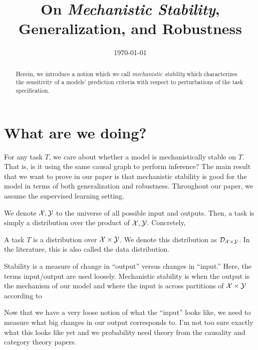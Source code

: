 \documentclass[10pt]{article}
\title{On \textit{Mechanistic Stability}, Generalization, and Robustness}
\date{\today}
\begin{document}
\ifthenelse{\isundefined{\showlinenum}}{
}{
\linenumbers
}
\maketitle

\begin{abstract}
Herein, we introduce a notion which we call \textit{mechanistic stability} which
characterizes the sensitivity of a models' prediction criteria with respect to
perturbations of the task specification.
\end{abstract}

{
\begin{spacing}{1}
\tableofcontents
\end{spacing}
}
\clearpage
\setcounter{page}{1}

\allowdisplaybreaks



\section{What are we doing?}
For any task $T$, we care about whether a model is mechanistically stable on $T$.
That is, is it using the same causal graph to perform inference? The main result
that we want to prove in our paper is that mechanistic stability is good for
the model in terms of both generalization and robustness. Throughout our paper,
we assume the supervised learning setting. 

We denote $\mathcal{X}, \mathcal{Y}$ to the universe of all possible input and outputs. Then, 
a task is simply a distribution over the product of $\mathcal{X},\mathcal{Y}$. Concretely,

\begin{defn}[Task]
A task $T$ is a distribution over $\mathcal{X} \times \mathcal{Y}$. We denote this
distribution as $\mathcal{D}_{\mathcal{X}\times\mathcal{Y}}$. In the literature, this is also
called the data distribution. 
\end{defn}
Stability is a measure of change in ``output'' versus changes in ``input.'' Here,
the terms input/output are used loosely. Mechanistic stability is when the output
is the mechanism of our model and where the input is across partitions of 
$\mathcal{X} \times \mathcal{Y}$ according to 
\begin{defn}

\end{defn}
Now that we have a very loose notion of what the ``input'' looks like, we
need to measure what big changes in our output corresponds to. I'm not too
sure exactly what this looks like yet and we probability need theory from
the causality and category theory papers.
\end{document}

